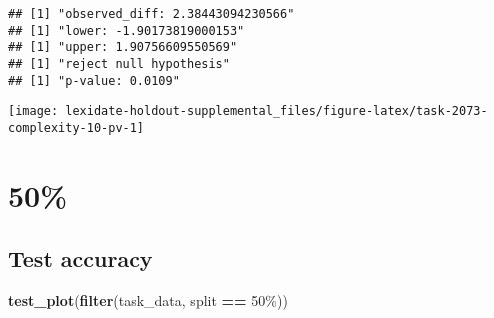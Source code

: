 \documentclass[
]{book}
\newenvironment{Shaded}{\begin{snugshade}}{\end{snugshade}}
\newcommand{\AttributeTok}[1]{\textcolor[rgb]{0.13,0.29,0.53}{#1}}
\newcommand{\DecValTok}[1]{\textcolor[rgb]{0.00,0.00,0.81}{#1}}
\newcommand{\FunctionTok}[1]{\textcolor[rgb]{0.13,0.29,0.53}{\textbf{#1}}}
\newcommand{\NormalTok}[1]{#1}
\newcommand{\OtherTok}[1]{\textcolor[rgb]{0.56,0.35,0.01}{#1}}
\newcommand{\SpecialCharTok}[1]{\textcolor[rgb]{0.81,0.36,0.00}{\textbf{#1}}}
\newcommand{\StringTok}[1]{\textcolor[rgb]{0.31,0.60,0.02}{#1}}
\begin{document}
\begin{Shaded}
\end{Shaded}

\begin{verbatim}
## [1] "observed_diff: 2.38443094230566"
## [1] "lower: -1.90173819000153"
## [1] "upper: 1.90756609550569"
## [1] "reject null hypothesis"
## [1] "p-value: 0.0109"
\end{verbatim}

\texttt{[image: lexidate-holdout-supplemental\_files/figure-latex/task-2073-complexity-10-pv-1]}

\hypertarget{section-42}{%
\section{50\%}\label{section-42}}

\hypertarget{test-accuracy-42}{%
\subsection{Test accuracy}\label{test-accuracy-42}}

\begin{Shaded}
\begin{Highlighting}[]
\FunctionTok{test\_plot}\NormalTok{(}\FunctionTok{filter}\NormalTok{(task\_data, split }\SpecialCharTok{==} \StringTok{\textquotesingle{}50\%\textquotesingle{}}\NormalTok{))}
\end{Highlighting}
\end{Shaded}
\end{document}

